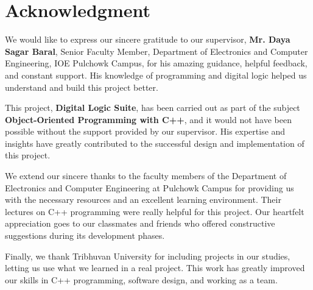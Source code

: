 \section*{Acknowledgment}

We would like to express our sincere gratitude to our supervisor, \textbf{Mr. Daya Sagar Baral}, Senior Faculty Member, Department of Electronics and Computer Engineering, IOE Pulchowk Campus, for his amazing guidance, helpful feedback, and constant support. His knowledge of programming and digital logic helped us understand and build this project better.

\vspace{0.5cm}
This project, \textbf{Digital Logic Suite}, has been carried out as part of the subject \textbf{Object-Oriented Programming with C++}, and it would not have been possible without the support provided by our supervisor. His expertise and insights have greatly contributed to the successful design and implementation of this project.

\vspace{0.5cm}
We extend our sincere thanks to the faculty members of the Department of Electronics and Computer Engineering at Pulchowk Campus for providing us with the necessary resources and an excellent learning environment. Their lectures on C++ programming were really helpful for this project. Our heartfelt appreciation goes to our classmates and friends who offered constructive suggestions during its development phases.

\vspace{0.5cm}
Finally, we thank Tribhuvan University for including projects in our studies, letting us use what we learned in a real project. This work has greatly improved our skills in C++ programming, software design, and working as a team.
\clearpage